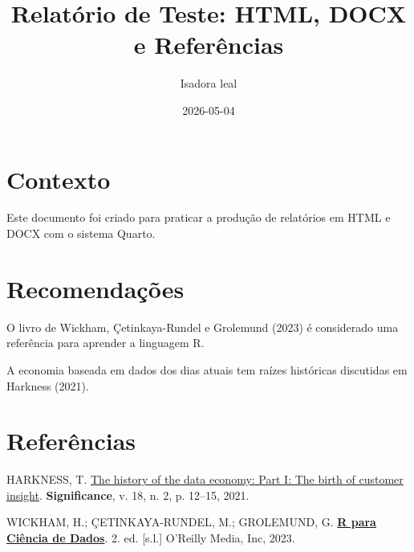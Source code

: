 \documentclass[
  brazilian,
  letterpaper,
  DIV=11,
  numbers=noendperiod]{scrartcl}
\title{Relatório de Teste: HTML, DOCX e Referências}
\author{Isadora leal}
\date{2026-05-04}
\newlength{\cslhangindent}
\newenvironment{CSLReferences}[2] %
 {\begin{list}{}{%
  \setlength{\itemindent}{0pt}
  \setlength{\leftmargin}{0pt}
  \setlength{\parsep}{0pt}
  \ifodd #1
   \setlength{\leftmargin}{\cslhangindent}
   \setlength{\itemindent}{-1\cslhangindent}
  \fi
  \setlength{\itemsep}{#2\baselineskip}}}
 {\end{list}}
\begin{document}
\maketitle


\section{Contexto}\label{contexto}

Este documento foi criado para praticar a produção de relatórios em HTML
e DOCX com o sistema Quarto.

\section{Recomendações}\label{recomendauxe7uxf5es}

O livro de Wickham, Çetinkaya-Rundel e Grolemund (2023) é considerado
uma referência para aprender a linguagem R.

A economia baseada em dados dos dias atuais tem raízes históricas
discutidas em Harkness (2021).

\section{Referências}\label{referuxeancias}

\label{refs}
\begin{CSLReferences}{0}{0}
HARKNESS, T. \href{https://doi.org/10.1111/1740-9713.01504}{The history
of the data economy: Part I: The birth of customer insight}.
\textbf{Significance}, v. 18, n. 2, p. 12--15, 2021.

WICKHAM, H.; ÇETINKAYA-RUNDEL, M.; GROLEMUND, G.
\textbf{\href{http://pt.r4ds.hadley.nz}{R para Ciência de Dados}}. 2.
ed. {[}s.l.{]} O'Reilly Media, Inc, 2023.

\end{CSLReferences}
\end{document}
